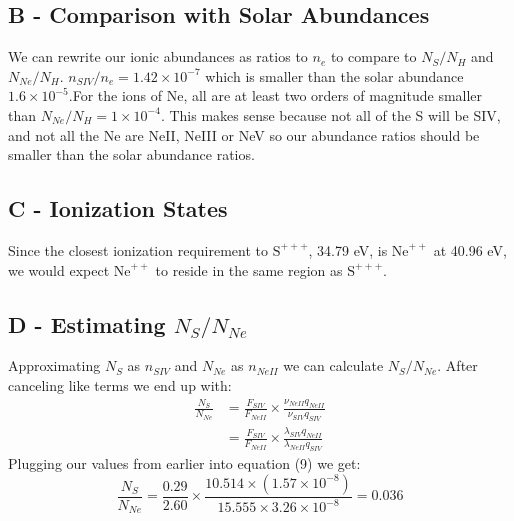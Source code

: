 \documentclass{article}
\begin{document}
\subsection{B - Comparison with Solar Abundances}
We can rewrite our ionic abundances as ratios to $n_e$ to compare to $N_S / N_H$ and $N_{Ne} / N_H$. $n_{SIV} / n_e = 1.42 \times 10^{-7}$ which is smaller than the solar abundance $1.6 \times 10^{-5}$.For the ions of Ne, all are at least two orders of magnitude smaller than $N_{Ne} / N_H = 1 \times 10^{-4}$. This makes sense because not all of the S will be SIV, and not all the Ne are NeII, NeIII or NeV so our abundance ratios should be smaller than the solar abundance ratios.

\subsection{C - Ionization States}
Since the closest ionization requirement to $\mathrm{S}^{+++}$, 34.79 eV, is $\mathrm{Ne}^{++}$ at 40.96 eV, we would expect $\mathrm{Ne}^{++}$ to reside in the same region as $\mathrm{S}^{+++}$. 

\subsection{D - Estimating $N_S / N_{Ne}$}
Approximating $N_S$ as $n_{SIV}$ and $N_{Ne}$ as $n_{NeII}$ we can calculate $N_S / N_{Ne}$. After canceling like terms we end up with:
\begin{align}
\frac{N_S}{N_{Ne}} &= \frac{F_{SIV}}{F_{NeII}} \times \frac{\nu_{NeII} q_{NeII}}{\nu_{SIV} q_{SIV}} \\
&= \frac{F_{SIV}}{F_{NeII}} \times \frac{\lambda_{SIV} q_{NeII}}{\lambda_{NeII} q_{SIV}}
\end{align}
Plugging our values from earlier into equation (9) we get:
\[
\frac{N_S}{N_{Ne}} = \frac{0.29}{2.60} \times \frac{10.514 \times \left(1.57 \times10^{-8}\right)}{15.555 \times 3.26 \times 10^{-8}} = 0.036
\]
\end{document}
